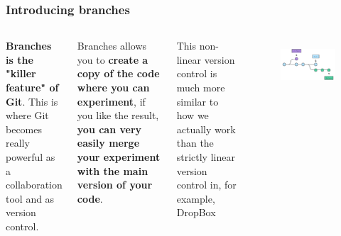 \documentclass[aspectratio=169]{beamer} %
\begin{document}
\begin{frame}
\frametitle{Introducing branches}

	\begin{columns}[c]

		\textbf{Branches is the "killer feature" of Git}. This is where Git becomes really powerful as a collaboration tool and as version control.

		\vspace{.25cm}

		Branches allows you to \textbf{create a copy of the code where you can experiment}, if you like the result, \textbf{you can very easily merge your experiment with the main version of your code}.

		\vspace{.25cm}

		This non-linear version control is much more similar to how we actually work than the strictly linear version control in, for example, DropBox

		\begin{figure}
			\centering
			\includegraphics[width=1\linewidth]{../../Common-Resources/img/branches}
			\label{fig:branches}
		\end{figure}

	\end{columns}

\end{frame}
\end{document}
